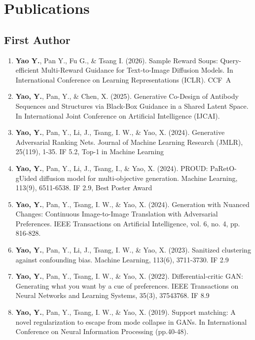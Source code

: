 \documentclass[10pt, letterpaper]{article}
\begin{document}
\section{Publications}
\subsection{First Author}
\begin{enumerate}
    \item \textbf{Yao Y.}, Pan Y., Fu G., \& Tsang I. (2026). Sample Reward Soups: Query-efficient Multi-Reward Guidance for Text-to-Image Diffusion Models. In International Conference on Learning Representations (ICLR). {\color{deeppink}CCF~A}
    \item \textbf{Yao, Y.}, Pan, Y., \& Chen, X. (2025). Generative Co-Design of Antibody Sequences and Structures via Black-Box Guidance in a Shared Latent Space. In International Joint Conference on Artificial Intelligence (IJCAI). {\color{deeppink}{Accepted as CCF A}}
    \item \textbf{Yao, Y.}, Pan, Y., Li, J., Tsang, I. W., \& Yao, X. (2024). Generative Adversarial Ranking Nets. Journal of Machine Learning Research (JMLR), 25(119), 1-35. {\color{deeppink}IF 5.2, Top-1 in Machine Learning}
    \item \textbf{Yao, Y.}, Pan, Y., Li, J., Tsang, I., \& Yao, X. (2024). PROUD: PaRetO-gUided diffusion model for multi-objective generation. Machine Learning, 113(9), 6511-6538. {\color{deeppink}IF 2.9, Best Poster Award}
    \item \textbf{Yao, Y.}, Pan, Y., Tsang, I. W., \& Yao, X. (2024). Generation with Nuanced Changes: Continuous Image-to-Image Translation with Adversarial Preferences. IEEE Transactions on Artificial Intelligence, vol. 6, no. 4, pp. 816-828.
    \item \textbf{Yao, Y.}, Pan, Y., Li, J., Tsang, I. W., \& Yao, X. (2023). Sanitized clustering against confounding bias. Machine Learning, 113(6), 3711-3730. {\color{deeppink}IF 2.9}
    \item \textbf{Yao, Y.}, Pan, Y., Tsang, I. W., \& Yao, X. (2022). Differential-critic GAN: Generating what you want by a cue of preferences. IEEE Transactions on Neural Networks and Learning Systems, 35(3), 37543768. {\color{deeppink}IF 8.9}
    \item \textbf{Yao, Y.}, Pan, Y., Tsang, I. W., \& Yao, X. (2019). Support matching: A novel regularization to escape from mode collapse in GANs. In International Conference on Neural Information Processing (pp.40-48).
\end{enumerate}
\end{document}
